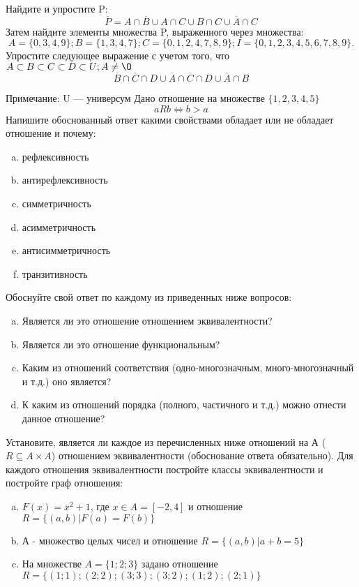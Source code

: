 \documentclass[10pt]{exam}
\begin{document}
\begin{questions}
\question
Найдите и упростите P:
\begin{equation*}
\overline{P} = A \cap \overline{B} \cup A \cap C \cup B \cap C \cup \overline{A} \cap C
\end{equation*}
Затем найдите элементы множества P, выраженного через множества:
\begin{equation*}
A = \{0, 3, 4, 9\}; 
B = \{1, 3, 4, 7\};
C = \{0, 1, 2, 4, 7, 8, 9\};
I = \{0, 1, 2, 3, 4, 5, 6, 7, 8, 9\}.
\end{equation*}\question
Упростите следующее выражение с учетом того, что $A\subset B \subset C \subset D \subset U; A \neq \O$
\begin{equation*}
\overline{B} \cap \overline{C} \cap D \cup \overline{A} \cap \overline{C} \cap D \cup \overline{A} \cap B
\end{equation*}

Примечание: U — универсум\question
Дано отношение на множестве $\{1, 2, 3, 4, 5\}$ 
\begin{equation*}
aRb \iff b > a
\end{equation*}
Напишите обоснованный ответ какими свойствами обладает или не обладает отношение и почему:   
\begin{enumerate} [a)]\setcounter{enumi}{0}
\item рефлексивность
\item антирефлексивность
\item симметричность
\item асимметричность
\item антисимметричность
\item транзитивность
\end{enumerate}

Обоснуйте свой ответ по каждому из приведенных ниже вопросов:
\begin{enumerate} [a)]\setcounter{enumi}{0}
    \item Является ли это отношение отношением эквивалентности?
    \item Является ли это отношение функциональным?
    \item Каким из отношений соответствия (одно-многозначным, много-многозначный и т.д.) оно является?
    \item К каким из отношений порядка (полного, частичного и т.д.) можно отнести данное отношение?
\end{enumerate}

\question
Установите, является ли каждое из перечисленных ниже отношений на А ($R \subseteq A \times A$) отношением эквивалентности (обоснование ответа обязательно). Для каждого отношения эквивалентности постройте классы эквивалентности и постройте граф отношения:
\begin{enumerate} [a)]\setcounter{enumi}{0}
\item $F(x)=x^{2}+1$, где $x \in A = [-2, 4]$ и отношение $R = \{(a,b)|F(a) = F(b)\}$
\item А - множество целых чисел и отношение $R = \{(a,b)|a + b = 5\}$
\item На множестве $A = \{1; 2; 3\}$ задано отношение $R = \{(1; 1); (2; 2); (3; 3); (3; 2); (1; 2); (2; 1)\}$


\end{enumerate}
\end{questions}
\end{document}
